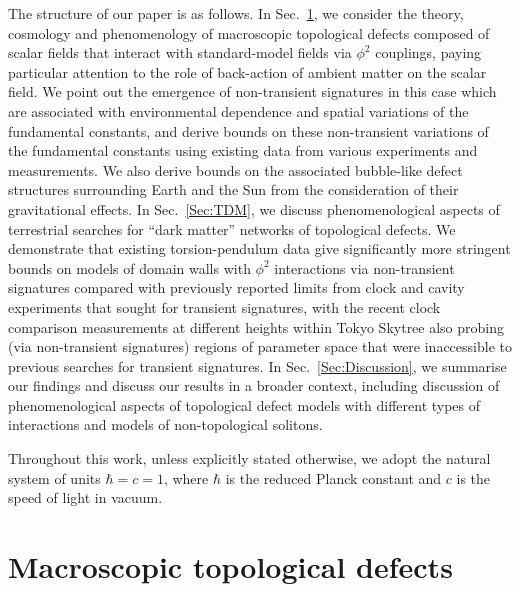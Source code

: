 \documentclass[aps,prd,onecolumn,nofootinbib]{revtex4-2} %
\begin{document}
The structure of our paper is as follows. 
In Sec.~\ref{Sec:Main}, we consider the theory, cosmology and phenomenology of macroscopic topological defects composed of scalar fields that interact with standard-model fields via $\phi^2$ couplings, paying particular attention to the role of back-action of ambient matter on the scalar field. 
We point out the emergence of non-transient signatures in this case which are associated with environmental dependence and spatial variations of the fundamental constants, and derive bounds on these non-transient variations of the fundamental constants using existing data from various experiments and measurements. 
We also derive bounds on the associated bubble-like defect structures surrounding Earth and the Sun from the consideration of their gravitational effects. 
In Sec.~\ref{Sec:TDM}, we discuss phenomenological aspects of terrestrial searches for ``dark matter'' networks of topological defects. 
We demonstrate that existing torsion-pendulum data give significantly more stringent bounds on models of domain walls with $\phi^2$ interactions via non-transient signatures compared with previously reported limits from clock and cavity experiments that sought for transient signatures, with the recent clock comparison measurements at different heights within Tokyo Skytree also probing (via non-transient signatures) regions of parameter space that were inaccessible to previous searches for transient signatures. 
In Sec.~\ref{Sec:Discussion}, we summarise our findings and discuss our results in a broader context, including discussion of phenomenological aspects of topological defect models with different types of interactions and models of non-topological solitons. 

Throughout this work, unless explicitly stated otherwise, we adopt the natural system of units $\hbar = c =1$, where $\hbar$ is the reduced Planck constant and $c$ is the speed of light in vacuum. 



\vspace{200mm}



\section{Macroscopic topological defects}
\label{Sec:Main}

\end{document}
